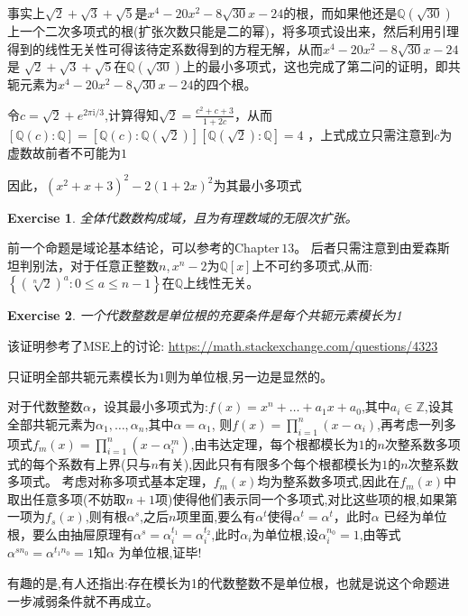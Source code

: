 \documentclass[12pt, a4paper]{ctexart}
\newenvironment{prooff}{{\noindent\it\textcolor{cyan!40!black}{Proof}:}\quad}{\par}
\newcommand{\bbrace}[1]{\left\{ #1 \right\} }
\newcommand{\bb}[1]{$\mathbb{#1}$}
\newtheorem{exer}{Exercise}[subsection]
\begin{document}
\begin{prooff}
    事实上$\sqrt{2}+\sqrt{3}+\sqrt{5}$是$x^4-20x^2-8\sqrt{30}x-24$的根，而如果他还是$\mathbb{Q}(\sqrt{30})$上一个二次多项式的根(扩张次数只能是二的幂)，将多项式设出来，然后利用引理得到的线性无关性可得该待定系数得到的方程无解，从而$x^4-20x^2-8\sqrt{30}x-24$是
    $\sqrt{2}+\sqrt{3}+\sqrt{5}$在$\mathbb{Q}(\sqrt{30})$上的最小多项式，这也完成了第二问的证明，即共轭元素为$x^4-20x^2-8\sqrt{30}x-24$的四个根。


    令$c=\sqrt{2}+e^{2\pi\text{i}/3}$,计算得知$\sqrt{2}=\frac{c^2+c+3}{1+2c}$，从而$[\mathbb{Q}(c):\mathbb{Q}]=[\mathbb{Q}(c):\mathbb{Q}(\sqrt{2})][\mathbb{Q}(\sqrt{2}):\mathbb{Q}]=4$
    ，上式成立只需注意到$c$为虚数故前者不可能为$1$

    因此，$(x^2+x+3)^2-2(1+2x)^2$为其最小多项式

\end{prooff}
\begin{exer}
    全体代数数构成域，且为有理数域的无限次扩张。
\end{exer}

\begin{prooff}
    前一个命题是域论基本结论，可以参考\cite{dummit1991abstract}的Chapter\,$13$。
    后者只需注意到由爱森斯坦判别法，对于任意正整数$n$,\,$x^n-2$为$\mathbb{Q}[x]$上不可约多项式,从而:
    $\bbrace{(\sqrt[n]{2})^a:0\le a\le n-1 }$在\bb{Q}上线性无关。
\end{prooff}
\begin{exer}
    一个代数整数是单位根的充要条件是每个共轭元素模长为1
\end{exer}
\begin{prooff}
    该证明参考了MSE上的讨论:
    \url{https://math.stackexchange.com/questions/4323}


    只证明全部共轭元素模长为$1$则为单位根,另一边是显然的。


    对于代数整数$\alpha$，设其最小多项式为:$f(x)=x^n+\dots+a_1x+a_0$,其中$a_i\in$\bb{Z},设其全部共轭元素为$\alpha_1,\dots,\alpha_n$,其中$\alpha=\alpha_1$,
    则$f(x)=\prod_{i=1}^{n}(x-\alpha_i)$,再考虑一列多项式$f_m(x)=\prod_{i=1}^{n}(x-\alpha_i^m)$,由韦达定理，每个根都模长为$1$的$n$次整系数多项式的每个系数有上界(只与$n$有关),因此只有有限多个每个根都模长为$1$的$n$次整系数多项式。
    考虑对称多项式基本定理\cite{丘维生}，$f_m(x)$均为整系数多项式,因此在$f_m(x)$中取出任意多项(不妨取$n+1$项)使得他们表示同一个多项式,对比这些项的根,如果第一项为$f_s(x)$,则有根$\alpha^s$,之后$n$项里面,要么有$\alpha^t$使得$\alpha^t=\alpha^t$，此时$\alpha$
    已经为单位根，要么由抽屉原理有$\alpha^s=\alpha_i^{t_1}=\alpha_i^{t_2}$,此时$\alpha_i$为单位根,设$\alpha_i^{n_0}=1$,由等式$\alpha^{sn_0}=\alpha^{t_1n_0}=1$知$\alpha$
    为单位根,证毕!
\end{prooff}
有趣的是,有人还指出:存在模长为1的代数整数不是单位根，也就是说这个命题进一步减弱条件就不再成立。
\end{document}
